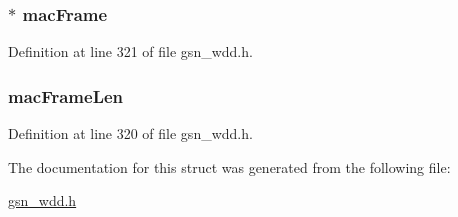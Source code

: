 \hypertarget{a00299_a98ed85cf798d5666f0316ef976962cd1}{
\subsubsection[{macFrame}]{$\ast$ {\bf macFrame}}}
\label{a00299_a98ed85cf798d5666f0316ef976962cd1}


Definition at line 321 of file gsn\_\-wdd.h.

\hypertarget{a00299_a497cc4340dcfaffcd97deb95bdd56b9f}{
\subsubsection[{macFrameLen}]{ {\bf macFrameLen}}}
\label{a00299_a497cc4340dcfaffcd97deb95bdd56b9f}


Definition at line 320 of file gsn\_\-wdd.h.



The documentation for this struct was generated from the following file:\begin{DoxyCompactItemize}
\item 
\hyperlink{a00603}{gsn\_\-wdd.h}\end{DoxyCompactItemize}
